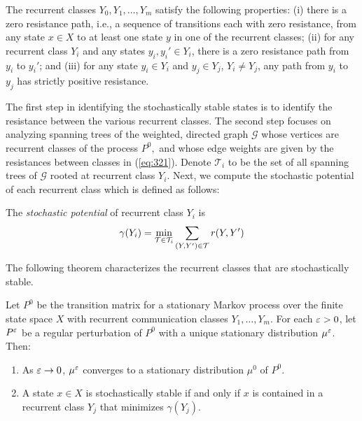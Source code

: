 The recurrent classes $Y_0,Y_1,\ldots,Y_m$ satisfy the following properties: (i) there is a zero resistance path, i.e., a sequence of transitions each with zero resistance, from any state $x \in X$ to at least one state $y$ in one of the recurrent classes; (ii) for any recurrent class $Y_i$ and any states $y_i,y_i' \in Y_i$, there is a zero resistance path from $y_i$ to $y_i'$; and (iii) for any state $y_i \in Y_i$ and $y_j \in Y_j$, $Y_i \neq Y_j$, any path from $y_i$ to $y_j$ has strictly positive resistance.  

The first step in identifying the stochastically stable states is to identify the resistance between the various recurrent classes.  %
The second step focuses on analyzing spanning trees of the weighted, directed graph $\mathcal{G}$ whose vertices are recurrent classes of the process $P^0,$ and whose edge weights are given by the resistances between classes in (\ref{eq:321}). Denote $\mathcal{T}_{i}$ to be the set of all spanning trees of $\mathcal{G}$ rooted at recurrent class $Y_i$. Next, we compute the stochastic potential of each recurrent class which is defined as follows:

%
\begin{defn}
The \emph{stochastic potential} of recurrent class $Y_i$ is 
\begin{equation*}
\gamma(Y_i) = \min_{{\cal T} \in \mathcal{T}_{i}} \sum_{(Y, Y')\in {\cal T}} r(Y,Y')
\end{equation*}
\end{defn}
%
The following theorem characterizes the recurrent classes that are stochastically stable.

\begin{Theorem} \label{t:Young Theorem}
Let $P^0$ be the transition matrix for a stationary Markov process over the finite state space $X$ with recurrent communication classes $Y_1,\ldots,Y_m$. For each $\varepsilon > 0$, let $P^\varepsilon$ be a regular perturbation of $P^0$ with a unique stationary distribution $\mu^\varepsilon$. Then:
\begin{enumerate}
\item  As $\varepsilon\to 0$, $\mu^\varepsilon$ converges to a stationary distribution $\mu^0$ of $P^0.$
\item A state $x \in X$ is stochastically stable if and only if $x$ is contained in a recurrent class $Y_j$ that minimizes $\gamma(Y_j).$
\end{enumerate}
\end{Theorem}

